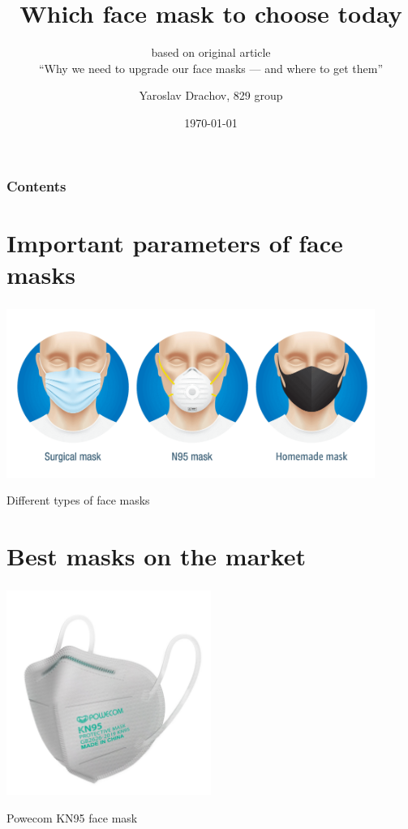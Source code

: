 \documentclass[c]{beamer}
\title{Which face mask to choose today}
\subtitle{based on original article\\
``Why we need to upgrade our face masks --- and where to get them''}
\author{Yaroslav Drachov, 829 group}
\date{\today}
\institute[MIPT]{Moscow Institute of Physics and Technology}
\begin{document}
  
%
\frame{\titlepage}
\begin{frame}
	\frametitle{Contents}
\tableofcontents
\end{frame}
\section{Important parameters of face masks}
\begin{frame}
	\frametitle{\insertsection}
\centering
		\includegraphics[width=0.9\textwidth]{12}

Different types of face masks
\end{frame}

\section{Best masks on the market}
\begin{frame}
\frametitle{\insertsection}
\centering
\includegraphics[width=0.5\textwidth]{2}

Powecom KN95 face mask
\end{frame}
\end{document}
